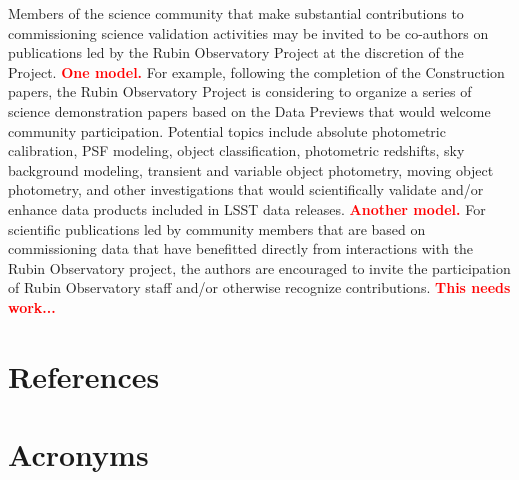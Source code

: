 \documentclass[SE,authoryear,toc]{lsstdoc}
\newcommand{\FIXME}[1]{{\bf \textcolor{red}{#1}}}
\begin{document}
Members of the science community that make substantial contributions to commissioning science validation activities may be invited to be co-authors on publications led by the Rubin Observatory Project at the discretion of the Project.
\FIXME{One model.}
For example, following the completion of the Construction papers, the Rubin Observatory Project is considering to organize a series of science demonstration papers based on the Data Previews that would welcome community participation.
Potential topics include absolute photometric calibration, PSF modeling, object classification, photometric redshifts, sky background modeling, transient and variable object photometry, moving object photometry, and other investigations that would scientifically validate and/or enhance data products included in LSST data releases.
\FIXME{Another model.}
For scientific publications led by community members that are based on commissioning data that have benefitted directly from interactions with the Rubin Observatory project, the authors are encouraged to invite the participation of Rubin Observatory staff and/or otherwise recognize contributions.
\FIXME{This needs work...}



\appendix
\section{References} \label{sec:bib}
\renewcommand{\refname}{} %


\section{Acronyms} \label{sec:acronyms}

\end{document}
